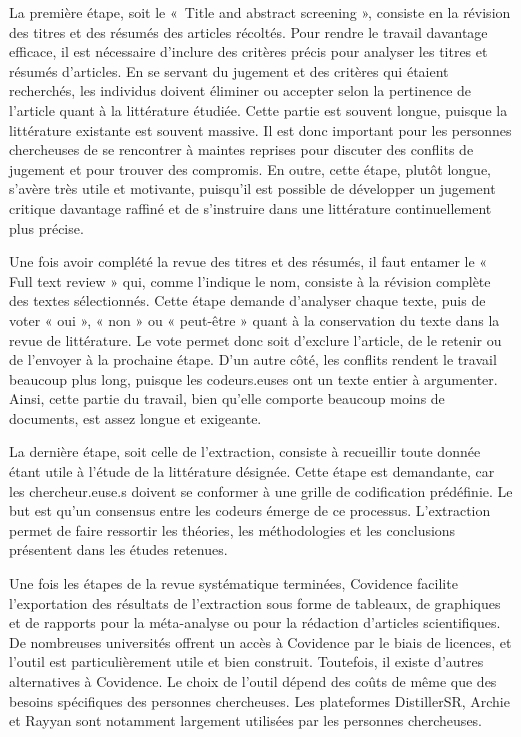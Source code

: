 \documentclass[
  letterpaper,
]{scrbook}
\begin{document}
La première étape, soit le «~Title and abstract screening », consiste en
la révision des titres et des résumés des articles récoltés. Pour rendre
le travail davantage efficace, il est nécessaire d'inclure des critères
précis pour analyser les titres et résumés d'articles. En se servant du
jugement et des critères qui étaient recherchés, les individus doivent
éliminer ou accepter selon la pertinence de l'article quant à la
littérature étudiée. Cette partie est souvent longue, puisque la
littérature existante est souvent massive. Il est donc important pour
les personnes chercheuses de se rencontrer à maintes reprises pour
discuter des conflits de jugement et pour trouver des compromis. En
outre, cette étape, plutôt longue, s'avère très utile et motivante,
puisqu'il est possible de développer un jugement critique davantage
raffiné et de s'instruire dans une littérature continuellement plus
précise.

Une fois avoir complété la revue des titres et des résumés, il faut
entamer le « Full text review » qui, comme l'indique le nom, consiste à
la révision complète des textes sélectionnés. Cette étape demande
d'analyser chaque texte, puis de voter « oui », « non » ou « peut-être »
quant à la conservation du texte dans la revue de littérature. Le vote
permet donc soit d'exclure l'article, de le retenir ou de l'envoyer à la
prochaine étape. D'un autre côté, les conflits rendent le travail
beaucoup plus long, puisque les codeurs.euses ont un texte entier à
argumenter. Ainsi, cette partie du travail, bien qu'elle comporte
beaucoup moins de documents, est assez longue et exigeante.

La dernière étape, soit celle de l'extraction, consiste à recueillir
toute donnée étant utile à l'étude de la littérature désignée. Cette
étape est demandante, car les chercheur.euse.s doivent se conformer à
une grille de codification prédéfinie. Le but est qu'un consensus entre
les codeurs émerge de ce processus. L'extraction permet de faire
ressortir les théories, les méthodologies et les conclusions présentent
dans les études retenues.

Une fois les étapes de la revue systématique terminées, Covidence
facilite l'exportation des résultats de l'extraction sous forme de
tableaux, de graphiques et de rapports pour la méta-analyse ou pour la
rédaction d'articles scientifiques. De nombreuses universités offrent un
accès à Covidence par le biais de licences, et l'outil est
particulièrement utile et bien construit. Toutefois, il existe d'autres
alternatives à Covidence. Le choix de l'outil dépend des coûts de même
que des besoins spécifiques des personnes chercheuses. Les plateformes
DistillerSR, Archie et Rayyan sont notamment largement utilisées par les
personnes chercheuses.
\end{document}
